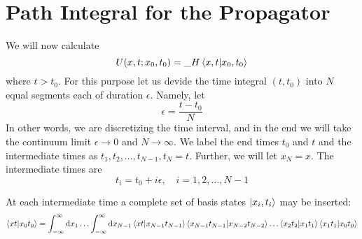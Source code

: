 	\section{Path Integral for the Propagator}
		We will now calculate
		\begin{equation}
			U(x,t;x_0, t_0) = {\_H}\braket{x,t}{x_0, t_0}
			\label{chapter12.eqn1-propagator-path-integral}
		\end{equation}
		where $t>t_0$. For this purpose let us devide the time integral $(t,t_0)$ into $N$ equal segments each of duration $\epsilon$. Namely, let
		\begin{equation}
			\epsilon = \frac{t-t_0}{N}
			\label{chapter12.eqn2-propagator-path-integral}
		\end{equation}
		In other words, we are discretizing the time interval, and in the end we will take the continuum limit $\epsilon\rightarrow 0$ and $N\rightarrow \infty$. We label the end times $t_0$ and $t$ and the intermediate times as $t_1, t_2, \ldots, t_{N-1}, t_N=t$. Further, we will let $x_N=x$. The intermediate times are 
		\begin{equation}
			t_i=t_0+i \epsilon, \quad i=1,2,\ldots,N-1
			\label{chapter12.eqn3-propagator-path-integral}
		\end{equation}
		
		At each intermediate time a complete set of basis states $\ket{x_i,t_i}$ may be inserted:
		\begin{equation}
			\braket{x t}{x_0 t_0} =\int_{-\infty}^{\infty}\dd{x_1} \ldots \int_{-\infty}^{\infty} \dd{x_{N-1}} \braket{x t}{x_{N-1} t_{N-1}}\braket{x_{N-1} t_{N-1}}{x_{N-2} t_{N-2}} \ldots \braket{x_2 t_2}{x_{1} t_{1}} \braket{x_1 t_1}{x_{0} t_{0}}
			\label{chapter12.eqn4-propagator-path-integral}
		\end{equation}
		

